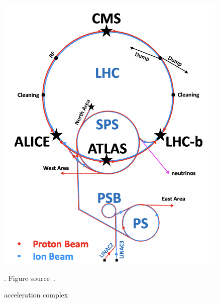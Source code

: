 \begin{figure}[t!]
\centering
\includegraphics[width=0.99\textwidth]{figures/acceleration_chain.png}
\caption[acceleration complex]{acceleration complex}. Figure source~\cite{SMtable}.
\label{fig:acceleration_complex}
\end{figure} 
   

